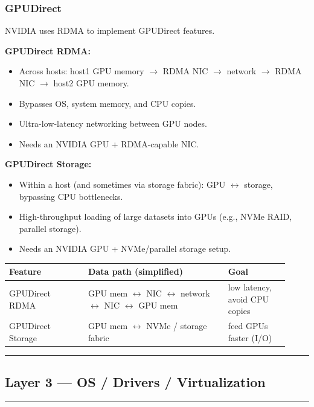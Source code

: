 \documentclass[11pt]{article}
\newcommand{\notespace}{
\vspace{0.8cm}
\hrule
\vspace{0.8cm}
}
\begin{document}
\subsubsection{GPUDirect}
NVIDIA uses RDMA to implement GPUDirect features.

\textbf{GPUDirect RDMA:}
\begin{itemize}
\item Across hosts: host1 GPU memory $\rightarrow$ RDMA NIC $\rightarrow$ network $\rightarrow$ RDMA NIC $\rightarrow$ host2 GPU memory.
\item Bypasses OS, system memory, and CPU copies.
\item Ultra-low-latency networking between GPU nodes.
\item Needs an NVIDIA GPU + RDMA-capable NIC.
\end{itemize}

\textbf{GPUDirect Storage:}
\begin{itemize}
\item Within a host (and sometimes via storage fabric): GPU $\leftrightarrow$ storage, bypassing CPU bottlenecks.
\item High-throughput loading of large datasets into GPUs (e.g., NVMe RAID, parallel storage).
\item Needs an NVIDIA GPU + NVMe/parallel storage setup.
\end{itemize}

\begin{center}
\renewcommand{\arraystretch}{1.15}
\begin{tabular}{|p{0.26\linewidth}|p{0.46\linewidth}|p{0.20\linewidth}|}
\hline
\textbf{Feature} & \textbf{Data path (simplified)} & \textbf{Goal} \\
\hline
GPUDirect RDMA & GPU mem $\leftrightarrow$ NIC $\leftrightarrow$ network $\leftrightarrow$ NIC $\leftrightarrow$ GPU mem & low latency, avoid CPU copies \\
\hline
GPUDirect Storage & GPU mem $\leftrightarrow$ NVMe / storage fabric & feed GPUs faster (I/O) \\
\hline
\end{tabular}
\end{center}

\notespace

\subsection{Layer 3 — OS / Drivers / Virtualization}
\notespace
\end{document}

